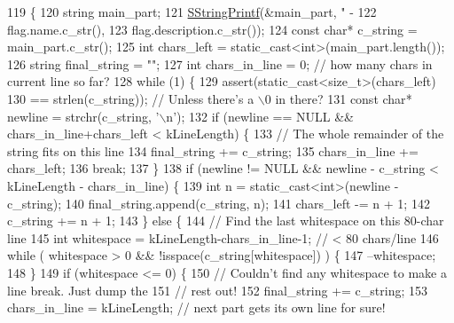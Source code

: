 \begin{DoxyCode}
119                                                         \{
120   \textcolor{keywordtype}{string} main\_part;
121   \hyperlink{namespaceGFLAGS__NAMESPACE_a576270d46d927dcdf09350f20c9b4014}{SStringPrintf}(&main\_part, \textcolor{stringliteral}{"    -%
122                 flag.name.c\_str(),
123                 flag.description.c\_str());
124   \textcolor{keyword}{const} \textcolor{keywordtype}{char}* c\_string = main\_part.c\_str();
125   \textcolor{keywordtype}{int} chars\_left = \textcolor{keyword}{static\_cast<}\textcolor{keywordtype}{int}\textcolor{keyword}{>}(main\_part.length());
126   \textcolor{keywordtype}{string} final\_string = \textcolor{stringliteral}{""};
127   \textcolor{keywordtype}{int} chars\_in\_line = 0;  \textcolor{comment}{// how many chars in current line so far?}
128   \textcolor{keywordflow}{while} (1) \{
129     assert(static\_cast<size\_t>(chars\_left)
130             == strlen(c\_string));  \textcolor{comment}{// Unless there's a \(\backslash\)0 in there?}
131     \textcolor{keyword}{const} \textcolor{keywordtype}{char}* newline = strchr(c\_string, \textcolor{charliteral}{'\(\backslash\)n'});
132     \textcolor{keywordflow}{if} (newline == NULL && chars\_in\_line+chars\_left < kLineLength) \{
133       \textcolor{comment}{// The whole remainder of the string fits on this line}
134       final\_string += c\_string;
135       chars\_in\_line += chars\_left;
136       \textcolor{keywordflow}{break};
137     \}
138     \textcolor{keywordflow}{if} (newline != NULL && newline - c\_string < kLineLength - chars\_in\_line) \{
139       \textcolor{keywordtype}{int} n = \textcolor{keyword}{static\_cast<}\textcolor{keywordtype}{int}\textcolor{keyword}{>}(newline - c\_string);
140       final\_string.append(c\_string, n);
141       chars\_left -= n + 1;
142       c\_string += n + 1;
143     \} \textcolor{keywordflow}{else} \{
144       \textcolor{comment}{// Find the last whitespace on this 80-char line}
145       \textcolor{keywordtype}{int} whitespace = kLineLength-chars\_in\_line-1;  \textcolor{comment}{// < 80 chars/line}
146       \textcolor{keywordflow}{while} ( whitespace > 0 && !isspace(c\_string[whitespace]) ) \{
147         --whitespace;
148       \}
149       \textcolor{keywordflow}{if} (whitespace <= 0) \{
150         \textcolor{comment}{// Couldn't find any whitespace to make a line break.  Just dump the}
151         \textcolor{comment}{// rest out!}
152         final\_string += c\_string;
153         chars\_in\_line = kLineLength;  \textcolor{comment}{// next part gets its own line for sure!}
}
\end{DoxyCode}
